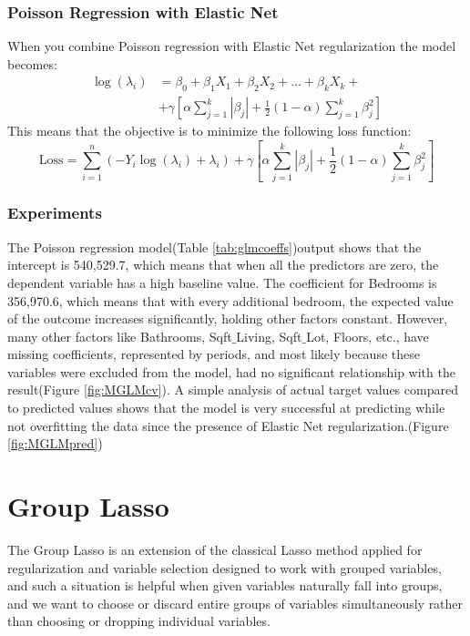 \documentclass[a4paper, 9pt]{article}
\begin{document}
\begin{multicols}{2}
\subsubsection*{Poisson Regression with Elastic Net}
When you combine Poisson regression with Elastic Net regularization the model becomes:
\begin{equation}
\begin{split}
\log(\lambda_i)&=\beta_0+\beta_1X_1+\beta_2X_2+\dots+\beta_kX_k+ \\
&+\gamma \left[\alpha \sum_{j=1}^k|\beta_j| + \frac{1}{2}(1-\alpha)\sum_{j=1}^k\beta_{j}^{2} \right]
\end{split}
\end{equation}
This means that the objective is to minimize the following loss function:
\begin{equation*}
\text{Loss}=\sum_{i=1}^n(-Y_i \log(\lambda_i)+ \lambda_i)+ \gamma \left[\alpha \sum_{j=1}^k|\beta_j| + \frac{1}{2}(1-\alpha)\sum_{j=1}^k\beta_{j}^{2} \right]
\end{equation*}

\subsubsection*{Experiments}
The Poisson regression model(Table \ref{tab:glmcoeffs})output shows that the intercept is 540,529.7, which means that when all the predictors are zero, the dependent variable has a high baseline value. The coefficient for Bedrooms is 356,970.6, which means that with every additional bedroom, the expected value of the outcome increases significantly, holding other factors constant. However, many other factors like Bathrooms, Sqft$\_$Living, Sqft$\_$Lot, Floors, etc., have missing coefficients, represented by periods, and most likely because these variables were excluded from the model, had no significant relationship with the result(Figure \ref{fig:MGLMcv}). A simple analysis of actual target values compared to predicted values shows that the model is very successful at predicting while not overfitting the data since the presence of Elastic Net regularization.(Figure \ref{fig:MGLMpred})

\section{Group Lasso} \vspace{-7pt}
The Group Lasso is an extension of the classical Lasso method applied for regularization and variable selection designed to work with grouped variables, and such a situation is helpful when given variables naturally fall into groups, and we want to choose or discard entire groups of variables simultaneously rather than choosing or dropping individual variables.


\end{multicols}
\end{document}
